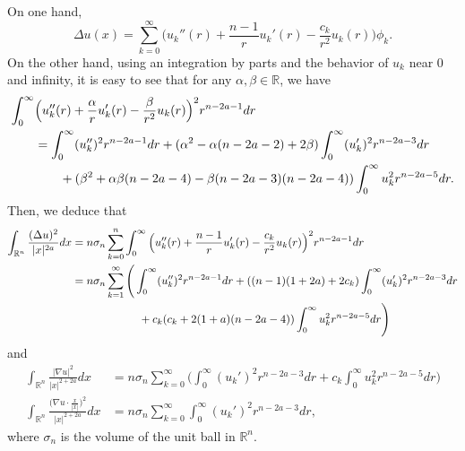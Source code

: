 \documentclass[a4paper,12pt]{article}
\theoremstyle{plain}
\theoremstyle{definition}
\theoremstyle{remark}
\def\R{\mathbb R}%
\def\irn{\int_{\R^n}}
\numberwithin{equation}{section}
\begin{document}
On one hand,
\[
\Delta u(x) = \sum_{k=0}^\infty \Big(u_k''(r) + \frac{n-1}r u_k'(r) - \frac{c_k}{r^2} u_k(r)\Big)\phi_k.
\]
On the other hand, using an  integration by parts and the behavior of $u_k$ near $0$ and infinity, it is easy to see that for any $\alpha, \beta \in \R$, we have
\begin{align*}%
\int_0^\infty &\Big(u_k''(r) + \frac{\alpha}r u_k'(r) - \frac{\beta}{r^2} u_k(r)\Big)^2 r^{n-2a -1} dr\notag\\
&= \int_0^\infty (u_k'')^2 r^{n-2a -1} dr + (\alpha^2 - \alpha(n-2a -2) +2\beta) \int_0^\infty (u_k')^2 r^{n-2a -3} dr\notag\\
&\qquad + (\beta^2 +\alpha\beta(n-2a -4) - \beta(n-2a -3)(n-2a -4))\int_0^\infty u_k^2 r^{n -2a -5} dr.
\end{align*}
Then, we deduce that 
\begin{align}\label{eq:integralDelta}
\irn \frac{(\Delta u)^2}{ |x|^{2a}} dx &= n\sigma_n\sum_{k=0}^n \int_0^\infty \Big(u_k''(r) + \frac{n-1}r u_k'(r) - \frac{c_k}{r^2} u_k(r)\Big)^2 r^{n-2a -1} dr\notag\\
&=n\sigma_n \sum_{k=1}^\infty\Bigg(\int_0^\infty (u_k'')^2 r^{n-2a -1} dr + ((n-1)(1+2a) +2c_k) \int_0^\infty (u_k')^2 r^{n-2a -3} dr\notag\\
&\qquad\qquad\qquad + c_k(c_k + 2(1+a)(n-2a -4))\int_0^\infty u_k^2 r^{n -2a -5} dr\Bigg)
\end{align}
and
\begin{align*}
	\irn \frac{|\nabla u|^2}{|x|^{2 + 2a}} dx& =n\sigma_n \sum_{k=0}^\infty\Bigg(\int_0^\infty (u_k')^2 r^{n-2a -3} dr + c_k \int_0^\infty u_k^2 r^{n -2a -5} dr\Bigg)\\
	\irn \frac{\Big(\nabla u \cdot \frac x{|x|}\Big)^2 }{|x|^{2 + 2a}} dx &= n\sigma_n \sum_{k=0}^\infty \int_0^\infty (u_k')^2 r^{n-2a -3} dr,
\end{align*}
where $\sigma_n$ is the volume of the unit ball in $\R^n$.
\end{document}
